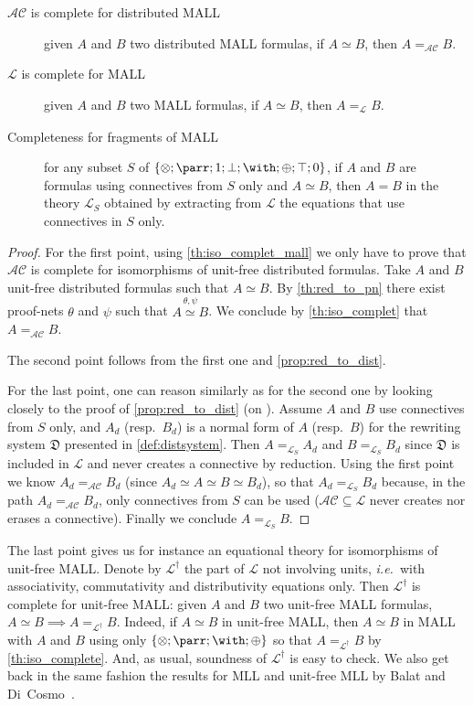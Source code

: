 \documentclass{lmcs}
\newcommand*{\tens}{\otimes} %
\newcommand*{\ie}{\emph{i.e.}}
\newcommand*{\resp}{resp.}
\newcommand*{\iso}{\mathrel{\simeq}} %
\newcommand*{\Eu}{\mathcal{L}} %
\newcommand*{\E}{{\Eu^\dagger}} %
\newcommand*{\AC}{\mathcal{AC}} %
\newcommand*{\eqeq}{=} %
\newcommand*{\eqE}{\eqeq_\E} %
\newcommand*{\eqEu}[1][]{\eqeq_{\Eu_{#1}}} %
\newcommand*{\eqAC}{\eqeq_\AC} %
\newcommand*{\distsystem}{\mathfrak{D}}
\newcommand{\isoproofs}[4]{\overset{\ensuremath{#3,#4}}{#1\iso #2}}
\begin{document}
\begin{thm}
\label{th:iso_complete}
\hfill
\begin{description}
\item[$\AC$ is complete for distributed MALL]
given $A$ and $B$ two distributed MALL formulas, if $A\iso B$, then $A\eqAC B$.
\item[$\Eu$ is complete for MALL]
given $A$ and $B$ two MALL formulas, if $A\iso B$, then $A\eqEu B$.
\item[Completeness for fragments of MALL]
for any subset $S$ of $\{\tens ; \parr ; 1 ; \bot ; \with ; \oplus ; \top ; 0\}$, if $A$ and $B$ are formulas using connectives from $S$ only and $A \iso B$, then $A = B$ in the theory $\Eu_S$ obtained by extracting from $\Eu$ the equations that use connectives in $S$ only.
\end{description}
\end{thm}
\begin{proof}
For the first point, using \autoref{th:iso_complet_mall} we only have to prove that $\AC$ is complete for isomorphisms of unit-free distributed formulas.
Take $A$ and $B$ unit-free distributed formulas such that $A\iso B$.
By \autoref{th:red_to_pn} there exist proof-nets $\theta$ and $\psi$ such that $\isoproofs{A}{B}{\theta}{\psi}$.
We conclude by \autoref{th:iso_complet} that $A\eqAC B$.

The second point follows from the first one and \autoref{prop:red_to_dist}.

For the last point, one can reason similarly as for the second one by looking closely to the proof of \autoref{prop:red_to_dist} (on ).
Assume $A$ and $B$ use connectives from $S$ only, and $A_d$ (\resp\ $B_d$) is a normal form of $A$ (\resp\ $B$) for the rewriting system $\distsystem$ presented in \autoref{def:distsystem}.
Then $A\eqEu[S] A_d$ and $B\eqEu[S] B_d$ since $\distsystem$ is included in $\Eu$ and never creates a connective by reduction.
Using the first point we know $A_d\eqAC B_d$ (since $A_d \iso A \iso B\iso B_d$), so that $A_d \eqEu[S] B_d$ because, in the path $A_d\eqAC B_d$, only connectives from $S$ can be used ($\AC\subseteq\Eu$ never creates nor erases a connective).
Finally we conclude $A\eqEu[S] B$.
\end{proof}

The last point gives us for instance an equational theory for isomorphisms of unit-free MALL.
Denote by $\E$ the part of $\Eu$ not involving units, \ie\ with associativity, commutativity and distributivity equations only.
Then $\E$ is complete for unit-free MALL:
given $A$ and $B$ two unit-free MALL formulas, $A\iso B \implies A\eqE B$.
Indeed, if $A\iso B$ in unit-free MALL, then $A\iso B$ in MALL with $A$ and $B$ using only $\{\tens ; \parr ; \with ; \oplus\}$ so that $A\eqE B$ by \autoref{th:iso_complete}.
And, as usual, soundness of $\E$ is easy to check.
We also get back in the same fashion the results for MLL and unit-free MLL by Balat and Di~Cosmo~\cite{mllisos}.
\end{document}
